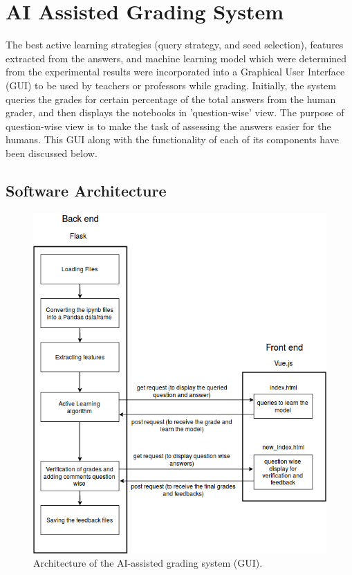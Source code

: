 

    \chapter{AI Assisted Grading System}

	The best active learning strategies (query strategy, and seed selection), features extracted from the answers, and machine learning model which were determined from the experimental results were incorporated into a Graphical User Interface (GUI) to be used by teachers or professors while grading. Initially, the system queries the grades for certain percentage of the total answers from the human grader, and then displays the notebooks in 'question-wise' view. The purpose of question-wise view is to make the task of assessing the answers easier for the humans. This GUI along with the functionality of each of its components have been discussed below. 
	   
    \section{Software Architecture}
    
    	\begin{figure}[!htb]
    		\centering
    		\includegraphics[scale=0.5]{images/gui_architecture}
    		\caption{Architecture of the AI-assisted grading system (GUI).}
    		\label{gui_architecture}
    	\end{figure}
	
